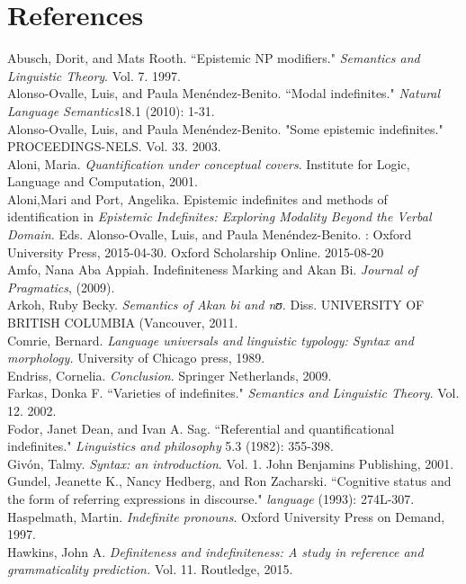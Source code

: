 \documentclass[output=paper,modfonts]{langsci/langscibook}
\begin{document}
\section*{References}
Abusch, Dorit, and Mats Rooth. ``Epistemic NP modifiers." \emph{Semantics and Linguistic Theory}. Vol. 7. 1997.\\
Alonso-Ovalle, Luis, and Paula Menéndez-Benito. ``Modal indefinites." \emph{Natural Language Semantics}18.1 (2010): 1-31.\\
Alonso-Ovalle, Luis, and Paula Menéndez-Benito. "Some epistemic indefinites." PROCEEDINGS-NELS. Vol. 33. 2003.\\
Aloni, Maria. \emph{Quantification under conceptual covers}. Institute for Logic, Language and Computation, 2001.\\
Aloni,Mari and Port, Angelika. Epistemic indefinites and methods of identification in \emph{Epistemic Indefinites: Exploring Modality Beyond the Verbal Domain.} Eds. Alonso-Ovalle, Luis, and Paula Menéndez-Benito. : Oxford University Press, 2015-04-30. Oxford Scholarship Online. 2015-08-20\\
 Amfo, Nana Aba Appiah. Indefiniteness Marking and Akan Bi. \emph{Journal of Pragmatics}, (2009).\\
Arkoh, Ruby Becky. \emph{Semantics of Akan bi and nʊ.} Diss. UNIVERSITY OF BRITISH COLUMBIA (Vancouver, 2011.\\
Comrie, Bernard. \emph{Language universals and linguistic typology: Syntax and morphology.} University of Chicago press, 1989.\\
Endriss, Cornelia. \emph{Conclusion}. Springer Netherlands, 2009.\\
Farkas, Donka F. ``Varieties of indefinites." \emph{Semantics and Linguistic Theory}. Vol. 12. 2002.\\
Fodor, Janet Dean, and Ivan A. Sag. ``Referential and quantificational indefinites." \emph{Linguistics and philosophy} 5.3 (1982): 355-398.\\
Givón, Talmy. \emph{Syntax: an introduction}. Vol. 1. John Benjamins Publishing, 2001.\\
Gundel, Jeanette K., Nancy Hedberg, and Ron Zacharski. ``Cognitive status and the form of referring expressions in discourse." \emph{language} (1993): 274L-307. \\
 Haspelmath, Martin. \emph{Indefinite pronouns}. Oxford University Press on Demand, 1997.\\
 Hawkins, John A. \emph{Definiteness and indefiniteness: A study in reference and grammaticality prediction.} Vol. 11. Routledge, 2015.
\end{document}
